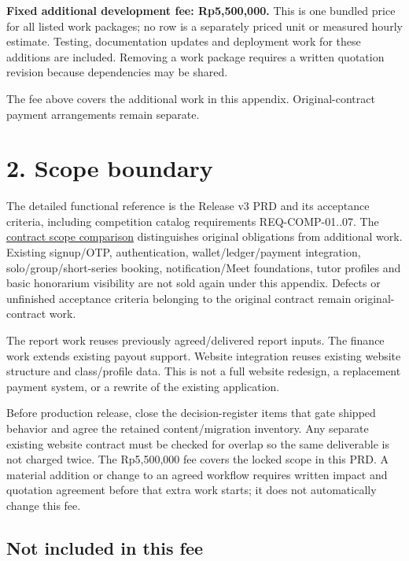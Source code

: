 \documentclass[11pt,a4paper]{article}
\begin{document}
\textbf{Fixed additional development fee: Rp5,500,000.} This is one bundled price for all listed work packages; no row is a separately priced unit or measured hourly estimate. Testing, documentation updates and deployment work for these additions are included. Removing a work package requires a written quotation revision because dependencies may be shared.

The fee above covers the additional work in this appendix. Original-contract payment arrangements remain separate.

\section{2. Scope boundary}\label{scope-boundary}

The detailed functional reference is the Release v3 PRD and its acceptance criteria, including competition catalog requirements REQ-COMP-01..07. The \href{../../docs/client/CONTRACT-SCOPE-DELTA.md}{contract scope comparison} distinguishes original obligations from additional work. Existing signup/OTP, authentication, wallet/ledger/payment integration, solo/group/short-series booking, notification/Meet foundations, tutor profiles and basic honorarium visibility are not sold again under this appendix. Defects or unfinished acceptance criteria belonging to the original contract remain original-contract work.

The report work reuses previously agreed/delivered report inputs. The finance work extends existing payout support. Website integration reuses existing website structure and class/profile data. This is not a full website redesign, a replacement payment system, or a rewrite of the existing application.

Before production release, close the decision-register items that gate shipped behavior and agree the retained content/migration inventory. Any separate existing website contract must be checked for overlap so the same deliverable is not charged twice. The Rp5,500,000 fee covers the locked scope in this PRD. A material addition or change to an agreed workflow requires written impact and quotation agreement before that extra work starts; it does not automatically change this fee.

\subsection{Not included in this fee}\label{not-included-in-this-fee}
\end{document}
